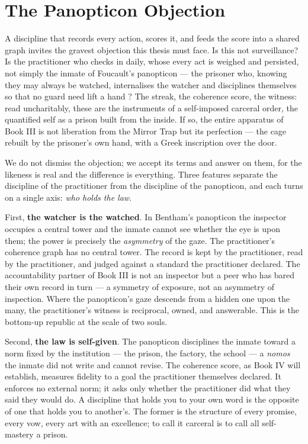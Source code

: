 \section{The Panopticon Objection}

A discipline that records every action, scores it, and feeds the score into a
shared graph invites the gravest objection this thesis must face. Is this not
surveillance? Is the practitioner who checks in daily, whose every act is weighed
and persisted, not simply the inmate of Foucault's panopticon --- the prisoner
who, knowing they may always be watched, internalises the watcher and disciplines
themselves so that no guard need lift a hand \parencite{foucault1977discipline}?
The streak, the coherence score, the witness: read uncharitably, these are the
instruments of a self-imposed carceral order, the quantified self as a prison
built from the inside. If so, the entire apparatus of Book III is not liberation
from the Mirror Trap but its perfection --- the cage rebuilt by the prisoner's own
hand, with a Greek inscription over the door.

We do not dismiss the objection; we accept its terms and answer on them, for the
likeness is real and the difference is everything. Three features separate the
discipline of the practitioner from the discipline of the panopticon, and each
turns on a single axis: \emph{who holds the law}.

First, \textbf{the watcher is the watched}. In Bentham's panopticon the inspector
occupies a central tower and the inmate cannot see whether the eye is upon them;
the power is precisely the \emph{asymmetry} of the gaze. The practitioner's
coherence graph has no central tower. The record is kept by the practitioner, read
by the practitioner, and judged against a standard the practitioner declared. The
accountability partner of Book III is not an inspector but a peer who has bared
their own record in turn --- a symmetry of exposure, not an asymmetry of
inspection. Where the panopticon's gaze descends from a hidden one upon the many,
the practitioner's witness is reciprocal, owned, and answerable. This is the
bottom-up republic at the scale of two souls.

Second, \textbf{the law is self-given}. The panopticon disciplines the inmate
toward a norm fixed by the institution --- the prison, the factory, the
school --- a \emph{nomos} the inmate did not write and cannot revise. The
coherence score, as Book IV will establish, measures fidelity to a goal the
practitioner themselves declared. It enforces no external norm; it asks only
whether the practitioner did what they said they would do. A discipline that holds
you to your own word is the opposite of one that holds you to another's. The
former is the structure of every promise, every vow, every art with an
excellence; to call it carceral is to call all self-mastery a prison.

